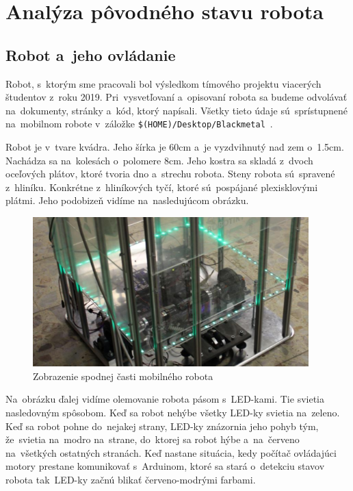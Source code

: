 \section{Analýza pôvodného stavu robota}
\label{sec:formerState}

\subsection{Robot a~jeho ovládanie}
\label{subsec:robotAOvladanie}

Robot, s~ktorým sme pracovali bol výsledkom tímového projektu viacerých študentov \newline z~roku 2019. Pri~vysvetľovaní
a~opisovaní robota sa budeme odvolávať na~dokumenty, stránky a~kód, ktorý napísali. Všetky tieto údaje sú~sprístupnené
na~mobilnom robote v~záložke \newline \texttt{\$(HOME)/Desktop/Blackmetal}~\cite{timovyProjekt}.

Robot je v~tvare kvádra. Jeho šírka je 60cm a~je vyzdvihnutý nad zem o~1.5cm. Nachádza sa na~kolesách o~polomere 8cm.
Jeho kostra sa skladá z~dvoch oceľových plátov, ktoré tvoria dno a~strechu robota. Steny robota sú~spravené z~hliníku.
Konkrétne z~hliníkových tyčí, ktoré sú~pospájané plexisklovými plátmi. Jeho podobizeň vidíme na~nasledujúcom
obrázku.

\begin{figure}[!htbp]
	\begin{center}
		\includegraphics[width=0.95\textwidth]{img/robot.png}
	\end{center}
	\caption{Zobrazenie spodnej časti mobilného robota~\cite{timovyProjekt}}
	\label{fig:robot}
\end{figure}

Na~obrázku ďalej vidíme olemovanie robota pásom s~LED-kami. Tie svietia nasledovným spôsobom. Keď sa robot nehýbe
všetky LED-ky svietia na~zeleno. Keď sa robot pohne do~nejakej strany, LED-ky znázornia jeho pohyb tým, že~svietia
na~modro na~strane, do~ktorej sa robot hýbe a~na~červeno na~všetkých ostatných stranách. Keď nastane situácia,
kedy počítač ovládajúci motory prestane komunikovať s~Arduinom, ktoré sa stará o~detekciu stavov robota
tak~LED-ky začnú blikať červeno-modrými farbami.

